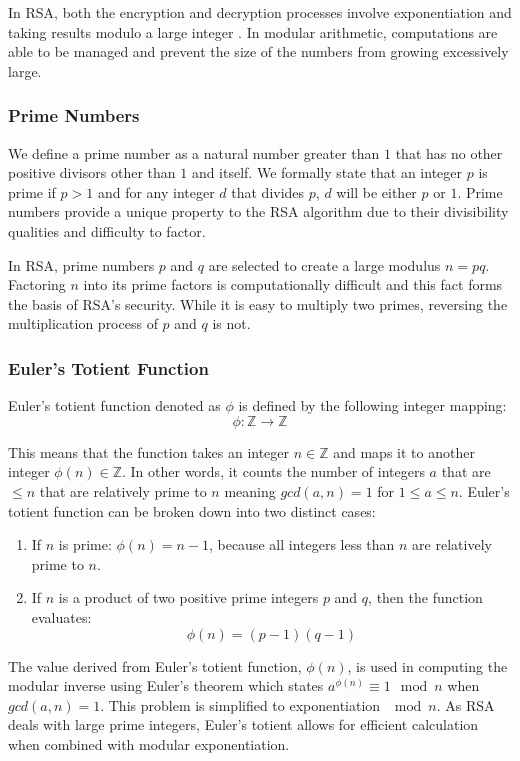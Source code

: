 \documentclass{article}
\begin{document}
In RSA, both the encryption and decryption processes involve exponentiation and taking results modulo a large integer . In modular arithmetic, computations are able to be managed and prevent the size of the numbers from growing excessively large.

\subsubsection{Prime Numbers}
We define a prime number as a natural number greater than $1$ that has no other positive divisors other than $1$ and itself. We formally state that an integer $p$ is prime if $p > 1$ and for any integer $d$ that divides $p$, $d$ will be either $p$ or $1$. Prime numbers provide a unique property to the RSA algorithm due to their divisibility qualities and difficulty to factor. 

In RSA, prime numbers $p$ and $q$ are selected to create a large modulus $n = pq$. Factoring $n$ into its prime factors is computationally difficult and this fact forms the basis of RSA’s security. While it is easy to multiply two primes, reversing the multiplication process of $p$ and $q$ is not.

\subsubsection{Euler's Totient Function}
Euler's totient function denoted as $\phi$ is defined by the following integer mapping:
\begin{equation}
\phi: \mathbb{Z} \to \mathbb{Z}
\end{equation}

This means that the function takes an integer $n \in \mathbb{Z}$ and maps it to another integer $\phi(n) \in \mathbb{Z}$. In other words, it counts the number of integers $a$ that are $\leq n$ that are relatively prime to $n$ meaning $gcd(a,n) = 1$ for $1 \leq a \leq n$. Euler's totient function can be broken down into two distinct cases:
\begin{enumerate}
    \item If $n$ is prime: $\phi(n) = n-1$, because all integers less than $n$ are relatively prime to $n$.
    \item If $n$ is a product of two positive prime integers $p$ and $q$, then the function evaluates:
\begin{equation}
\phi(n) = (p-1)(q-1)
\end{equation}
\end{enumerate}
The value derived from Euler's totient function, $\phi(n)$, is used in computing the modular inverse using Euler's theorem which states $a^{\phi(n)} \equiv 1 \mod n$ when $gcd(a,n) = 1$. This problem is simplified to exponentiation $\mod n$. As RSA deals with large prime integers, Euler's totient allows for efficient calculation when combined with modular exponentiation. 
\end{document}
